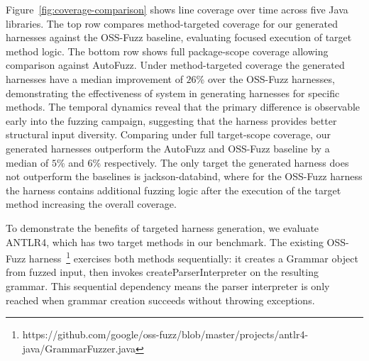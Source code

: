 Figure~\ref{fig:coverage-comparison} shows line coverage over time across five Java libraries. The top row compares method-targeted coverage for our generated harnesses against the OSS-Fuzz baseline, evaluating focused execution of target method logic. The bottom row shows full package-scope coverage allowing comparison against AutoFuzz.
Under method-targeted coverage the generated harnesses have a median improvement of $26$\% over the OSS-Fuzz harnesses, demonstrating the effectiveness of system in generating harnesses for specific methods. The temporal dynamics reveal that the primary difference is observable early into the fuzzing campaign, suggesting that the harness provides better structural input diversity.
Comparing under full target-scope coverage, our generated harnesses outperform the AutoFuzz and OSS-Fuzz baseline by a median of $5$\% and $6$\% respectively. The only target the generated harness does not outperform the baselines is jackson-databind, where for the OSS-Fuzz harness the harness contains additional fuzzing logic after the execution of the target method increasing the overall coverage. 
%
%
%
\par

To demonstrate the benefits of targeted harness generation, we evaluate ANTLR4, which has two target methods in our benchmark. The existing OSS-Fuzz harness~\footnote{https://github.com/google/oss-fuzz/blob/master/projects/antlr4-java/GrammarFuzzer.java} exercises both methods sequentially: it creates a Grammar object from fuzzed input, then invokes createParserInterpreter on the resulting grammar. This sequential dependency means the parser interpreter is only reached when grammar creation succeeds without throwing exceptions.
